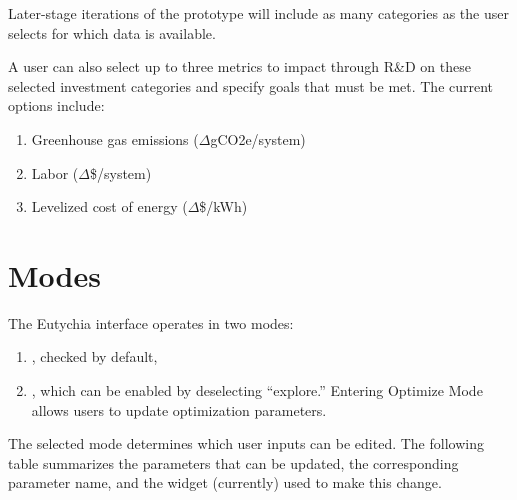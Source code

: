 \documentclass[letterpaper,10pt,english]{sphinxmanual}
\begin{document}
Later-stage iterations of the prototype will include as many categories
as the user selects for which data is available.

 A user can also select up to three metrics to impact through
R\&D on these selected investment categories and specify goals that must
be met. The current options include:
\begin{enumerate}
\def\theenumi{\arabic{enumi}}
\def\labelenumi{\theenumi .}
\makeatletter\def\p@enumii{\p@enumi \theenumi .}\makeatother
\item {} 
Greenhouse gas emissions (\(\Delta\)gCO2e/system)

\item {} 
Labor (\(\Delta\)\$/system)

\item {} 
Levelized cost of energy (\(\Delta\)\$/kWh)

\end{enumerate}


\section{Modes}
\label{\detokenize{user-interface:modes}}
The Eutychia interface operates in two modes:
\begin{enumerate}
\def\theenumi{\arabic{enumi}}
\def\labelenumi{\theenumi .}
\makeatletter\def\p@enumii{\p@enumi \theenumi .}\makeatother
\item {} 
, checked by default,

\item {} 
, which can be enabled by deselecting “explore.” Entering Optimize Mode allows users to update optimization parameters.

\end{enumerate}

The selected mode determines which user inputs can be edited. The
following table summarizes the parameters that can be updated, the
corresponding  parameter name, and the widget (currently)
used to make this change.
\end{document}
